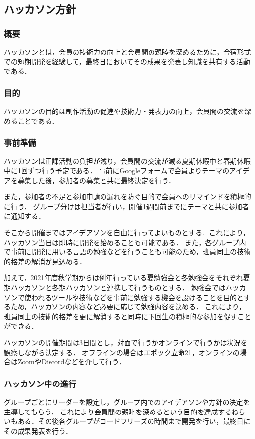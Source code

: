 \subsection*{ハッカソン方針}


\subsubsection*{概要}
ハッカソンとは，会員の技術力の向上と会員間の親睦を深めるために，合宿形式での短期開発を経験して，最終日においてその成果を発表し知識を共有する活動である．

\subsubsection*{目的}
ハッカソンの目的は制作活動の促進や技術力・発表力の向上，会員間の交流を深めることである．

\subsubsection*{事前準備}
ハッカソンは正課活動の負担が減り，会員間の交流が減る夏期休暇中と春期休暇中に1回ずつ行う予定である．
事前にGoogleフォームで会員よりテーマのアイデアを募集した後，参加者の募集と共に最終決定を行う．

また，参加者の不足と参加申請の漏れを防ぐ目的で会員へのリマインドを積極的に行う．
グループ分けは担当者が行い，開催1週間前までにテーマと共に参加者に通知する．

そこから開催まではアイデアソンを自由に行ってよいものとする．これにより，ハッカソン当日は即時に開発を始めることも可能である．
また，各グループ内で事前に開発に用いる言語の勉強などを行うことも可能のため，班員同士の技術的格差の解消が見込める．

加えて，2021年度秋学期からは例年行っている夏勉強会と冬勉強会をそれぞれ夏期ハッカソンと冬期ハッカソンと連携して行うものとする．
勉強会ではハッカソンで使われるツールや技術などを事前に勉強する機会を設けることを目的とするため，ハッカソンの内容など必要に応じて勉強内容を決める．
これにより，班員同士の技術的格差を更に解消すると同時に下回生の積極的な参加を促すことができる．


ハッカソンの開催期間は3日間とし，対面で行うかオンラインで行うかは状況を観察しながら決定する．
オフラインの場合はエポック立命21，オンラインの場合はZoomやDiscordなどを介して行う．

\subsubsection*{ハッカソン中の進行}
グループごとにリーダーを設定し，グループ内でのアイデアソンや方針の決定を主導してもらう．
これにより会員間の親睦を深めるという目的を達成するねらいもある．その後各グループがコードフリーズの時間まで開発を行い，最終日にその成果発表を行う．

